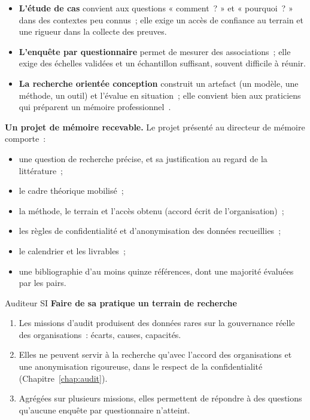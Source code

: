 \begin{itemize}
    \item \textbf{L'étude de cas} convient aux questions « comment~? » et
          « pourquoi~? » dans des contextes peu connus~; elle exige un
          accès de confiance au terrain et une rigueur dans la collecte des
          preuves.
    \item \textbf{L'enquête par questionnaire} permet de mesurer des
          associations~; elle exige des échelles validées et un échantillon
          suffisant, souvent difficile à réunir.
    \item \textbf{La recherche orientée conception} construit un artefact
          (un modèle, une méthode, un outil) et l'évalue en situation~; elle
          convient bien aux praticiens qui préparent un mémoire
          professionnel~\cite{hevner2004design}.
\end{itemize}

\begin{boxprocedure}
\textbf{Un projet de mémoire recevable.} Le projet présenté au directeur
de mémoire comporte~:
\begin{itemize}
    \item une question de recherche précise, et sa justification au regard
          de la littérature~;
    \item le cadre théorique mobilisé~;
    \item la méthode, le terrain et l'accès obtenu (accord écrit de
          l'organisation)~;
    \item les règles de confidentialité et d'anonymisation des données
          recueillies~;
    \item le calendrier et les livrables~;
    \item une bibliographie d'au moins quinze références, dont une majorité
          évaluées par les pairs.
\end{itemize}
\end{boxprocedure}

\begin{boxmetier}{Auditeur SI}
\textbf{Faire de sa pratique un terrain de recherche}
\begin{enumerate}
    \item Les missions d'audit produisent des données rares sur la
          gouvernance réelle des organisations~: écarts, causes,
          capacités.
    \item Elles ne peuvent servir à la recherche qu'avec l'accord des
          organisations et une anonymisation rigoureuse, dans le respect de
          la confidentialité (Chapitre~\ref{chap:audit}).
    \item Agrégées sur plusieurs missions, elles permettent de répondre à
          des questions qu'aucune enquête par questionnaire n'atteint.
\end{enumerate}
\end{boxmetier}

